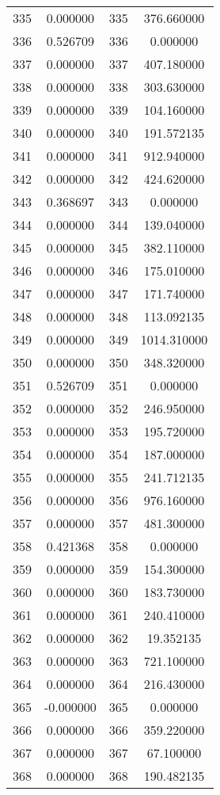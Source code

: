 \documentclass[12pt]{article}
\begin{document}
\begin{longtable}{@{}cccc@{}}
335 & 0.000000 & 335 & 376.660000 \\
336 & 0.526709 & 336 & 0.000000 \\
337 & 0.000000 & 337 & 407.180000 \\
338 & 0.000000 & 338 & 303.630000 \\
339 & 0.000000 & 339 & 104.160000 \\
340 & 0.000000 & 340 & 191.572135 \\
341 & 0.000000 & 341 & 912.940000 \\
342 & 0.000000 & 342 & 424.620000 \\
343 & 0.368697 & 343 & 0.000000 \\
344 & 0.000000 & 344 & 139.040000 \\
345 & 0.000000 & 345 & 382.110000 \\
346 & 0.000000 & 346 & 175.010000 \\
347 & 0.000000 & 347 & 171.740000 \\
348 & 0.000000 & 348 & 113.092135 \\
349 & 0.000000 & 349 & 1014.310000 \\
350 & 0.000000 & 350 & 348.320000 \\
351 & 0.526709 & 351 & 0.000000 \\
352 & 0.000000 & 352 & 246.950000 \\
353 & 0.000000 & 353 & 195.720000 \\
354 & 0.000000 & 354 & 187.000000 \\
355 & 0.000000 & 355 & 241.712135 \\
356 & 0.000000 & 356 & 976.160000 \\
357 & 0.000000 & 357 & 481.300000 \\
358 & 0.421368 & 358 & 0.000000 \\
359 & 0.000000 & 359 & 154.300000 \\
360 & 0.000000 & 360 & 183.730000 \\
361 & 0.000000 & 361 & 240.410000 \\
362 & 0.000000 & 362 & 19.352135 \\
363 & 0.000000 & 363 & 721.100000 \\
364 & 0.000000 & 364 & 216.430000 \\
365 & -0.000000 & 365 & 0.000000 \\
366 & 0.000000 & 366 & 359.220000 \\
367 & 0.000000 & 367 & 67.100000 \\
368 & 0.000000 & 368 & 190.482135 \\

\end{longtable}
\end{document}

